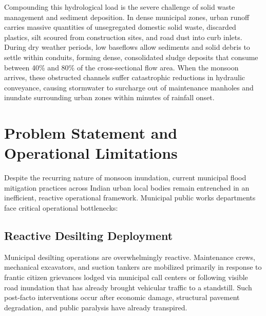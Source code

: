 Compounding this hydrological load is the severe challenge of solid waste management and sediment deposition. In dense municipal zones, urban runoff carries massive quantities of unsegregated domestic solid waste, discarded plastics, silt scoured from construction sites, and road dust into curb inlets. During dry weather periods, low baseflows allow sediments and solid debris to settle within conduits, forming dense, consolidated sludge deposits that consume between 40\% and 80\% of the cross-sectional flow area. When the monsoon arrives, these obstructed channels suffer catastrophic reductions in hydraulic conveyance, causing stormwater to surcharge out of maintenance manholes and inundate surrounding urban zones within minutes of rainfall onset.

\section{Problem Statement and Operational Limitations}
Despite the recurring nature of monsoon inundation, current municipal flood mitigation practices across Indian urban local bodies remain entrenched in an inefficient, reactive operational framework. Municipal public works departments face critical operational bottlenecks:

\subsection{Reactive Desilting Deployment}
Municipal desilting operations are overwhelmingly reactive. Maintenance crews, mechanical excavators, and suction tankers are mobilized primarily in response to frantic citizen grievances lodged via municipal call centers or following visible road inundation that has already brought vehicular traffic to a standstill. Such post-facto interventions occur after economic damage, structural pavement degradation, and public paralysis have already transpired.

